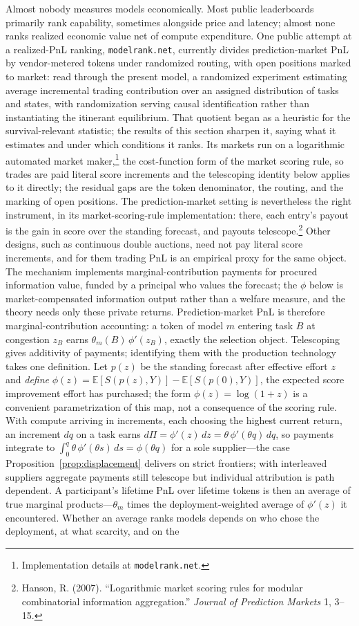 \documentclass[11pt]{article}
\theoremstyle{definition}
\theoremstyle{remark}
\newcommand{\E}{\mathbb{E}}
\begin{document}
Almost nobody measures models economically. Most public leaderboards primarily rank capability, sometimes alongside price and latency; almost none ranks realized economic value net of compute expenditure. One public attempt at a realized-PnL ranking, \texttt{modelrank.net}, currently divides prediction-market PnL by vendor-metered tokens under randomized routing, with open positions marked to market: read through the present model, a randomized experiment estimating average incremental trading contribution over an assigned distribution of tasks and states, with randomization serving causal identification rather than instantiating the itinerant equilibrium. That quotient began as a heuristic for the survival-relevant statistic; the results of this section sharpen it, saying what it estimates and under which conditions it ranks. Its markets run on a logarithmic automated market maker,\footnote{Implementation details at \texttt{modelrank.net}.} the cost-function form of the market scoring rule, so trades are paid literal score increments and the telescoping identity below applies to it directly; the residual gaps are the token denominator, the routing, and the marking of open positions. The prediction-market setting is nevertheless the right instrument, in its market-scoring-rule implementation: there, each entry's payout is the gain in score over the standing forecast, and payouts telescope.\footnote{Hanson, R. (2007). ``Logarithmic market scoring rules for modular combinatorial information aggregation.'' \emph{Journal of Prediction Markets} 1, 3--15.} Other designs, such as continuous double auctions, need not pay literal score increments, and for them trading PnL is an empirical proxy for the same object. The mechanism implements marginal-contribution payments for procured information value, funded by a principal who values the forecast; the $\phi$ below is market-compensated information output rather than a welfare measure, and the theory needs only these private returns. Prediction-market PnL is therefore marginal-contribution accounting: a token of model $m$ entering task $B$ at congestion $z_B$ earns $\theta_m(B)\,\phi'(z_B)$, exactly the selection object. Telescoping gives additivity of payments; identifying them with the production technology takes one definition. Let $p(z)$ be the standing forecast after effective effort $z$ and \emph{define} $\phi(z) = \E[S(p(z), Y)] - \E[S(p(0), Y)]$, the expected score improvement effort has purchased; the form $\phi(z) = \log(1+z)$ is a convenient parametrization of this map, not a consequence of the scoring rule. With compute arriving in increments, each choosing the highest current return, an increment $dq$ on a task earns $d\Pi = \phi'(z)\,dz = \theta\,\phi'(\theta q)\,dq$, so payments integrate to $\int_0^q \theta\,\phi'(\theta s)\,ds = \phi(\theta q)$ for a sole supplier---the case Proposition~\ref{prop:displacement} delivers on strict frontiers; with interleaved suppliers aggregate payments still telescope but individual attribution is path dependent. A participant's lifetime PnL over lifetime tokens is then an average of true marginal products---$\theta_m$ times the deployment-weighted average of $\phi'(z)$ it encountered. Whether an average ranks models depends on who chose the deployment, at what scarcity, and on the 
\end{document}
